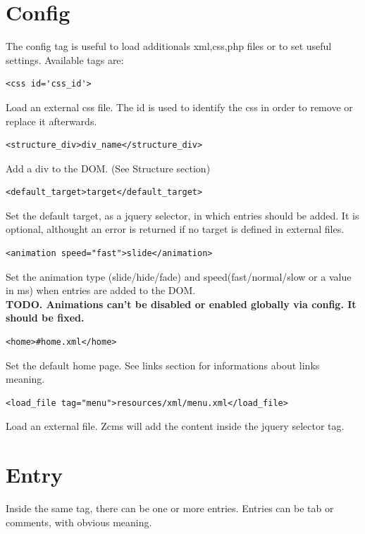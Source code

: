 \documentclass[a4paper,12pt]{article}
\begin{document}
\section{Config}
The config tag is useful to load additionals xml,css,php files or to set useful settings. Available tags are:
\begin{list}{-}{}
\item \begin{verbatim}
<css id='css_id'>       
      \end{verbatim}
Load an external css file. The id is used to identify the css in order to remove or replace it afterwards.
\item \begin{verbatim}
<structure_div>div_name</structure_div>       
      \end{verbatim}
Add a div to the DOM. (See Structure section)
\item \begin{verbatim}
<default_target>target</default_target>       
      \end{verbatim}
Set the default target, as a jquery selector, in which entries should be added. It is optional, althought an error is returned if no target is defined in external files.
\item \begin{verbatim}
<animation speed="fast">slide</animation>
      \end{verbatim}
Set the animation type (slide/hide/fade) and speed(fast/normal/slow or a value in ms) when entries are added to the DOM.\\
\bfseries{TODO}. \normalfont Animations can't be disabled or enabled globally via config. It should be fixed.
\item \begin{verbatim}
<home>#home.xml</home>
      \end{verbatim}
Set the default home page. See links section for informations about links meaning.
\item \begin{verbatim}
<load_file tag="menu">resources/xml/menu.xml</load_file>
      \end{verbatim}
Load an external file. Zcms will add the content inside the jquery selector tag.
\end{list}

\section{Entry}
Inside the same tag, there can be one or more entries. Entries can be tab or comments, with obvious meaning.
\end{document}
